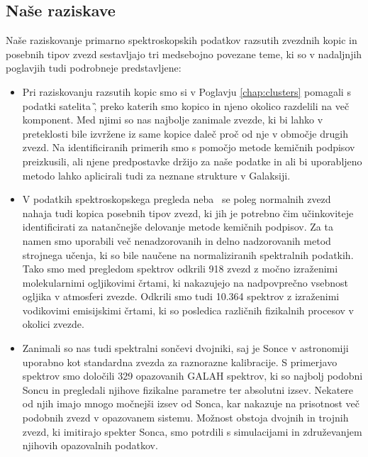 \subsection{Naše raziskave}
\label{sec:slo_raziskave}
Naše raziskovanje primarno spektroskopskih podatkov razsutih zvezdnih kopic in posebnih tipov zvezd sestavljajo tri medsebojno povezane teme, ki so v nadaljnjih poglavjih tudi podrobneje predstavljene:

\begin{itemize}
	\item Pri raziskovanju razsutih kopic smo si v Poglavju \ref{chap:clusters} pomagali s podatki satelita \G, preko katerih smo kopico in njeno okolico razdelili na več komponent. Med njimi so nas najbolje zanimale zvezde, ki bi lahko v preteklosti bile izvržene iz same kopice daleč proč od nje v območje drugih zvezd. Na identificiranih primerih smo s pomočjo metode kemičnih podpisov preizkusili, ali njene predpostavke držijo za naše podatke in ali bi uporabljeno metodo lahko aplicirali tudi za neznane strukture v Galaksiji.
	
	\item V podatkih spektroskopskega pregleda neba \Gh\ se poleg normalnih zvezd nahaja tudi kopica posebnih tipov zvezd, ki jih je potrebno čim učinkoviteje identificirati za natančnejše delovanje metode kemičnih podpisov. Za ta namen smo uporabili več nenadzorovanih in delno nadzorovanih metod strojnega učenja, ki so bile naučene na normaliziranih spektralnih podatkih. Tako smo med pregledom spektrov odkrili 918 zvezd z močno izraženimi molekularnimi ogljikovimi črtami, ki nakazujejo na nadpovprečno vsebnost ogljika v atmosferi zvezde. Odkrili smo tudi 10.364 spektrov z izraženimi vodikovimi emisijskimi črtami, ki so posledica različnih fizikalnih procesov v okolici zvezde. 
		
	\item Zanimali so nas tudi spektralni sončevi dvojniki, saj je Sonce v astronomiji uporabno kot standardna zvezda za raznorazne kalibracije. S primerjavo spektrov smo določili 329 opazovanih GALAH spektrov, ki so najbolj podobni Soncu in pregledali njihove fizikalne parametre ter absolutni izsev. Nekatere od njih imajo mnogo močnejši izsev od Sonca, kar nakazuje na prisotnost več podobnih zvezd v opazovanem sistemu. Možnost obstoja dvojnih in trojnih zvezd, ki imitirajo spekter Sonca, smo potrdili s simulacijami in združevanjem njihovih opazovalnih podatkov.
	
\end{itemize}

